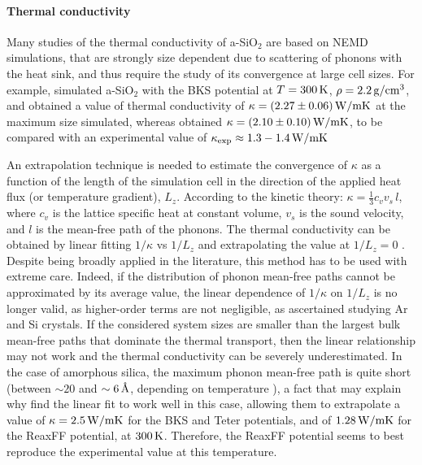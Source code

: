 \paragraph{Thermal conductivity}
Many studies of the thermal conductivity of a-SiO$_2$ are based on NEMD simulations, that are strongly size dependent due to scattering of phonons with the heat sink, and thus require the study of its convergence at large cell sizes. 
For example, \citet{Tian2017} simulated a-SiO$_2$ with the BKS potential at $T=300\,\mathrm{K}$, $\rho=2.2\,\mathrm{g/cm^3}$, and obtained a value of thermal conductivity of $\kappa=(2.27 \pm 0.06)\,\mathrm{W/mK}$ at the maximum size simulated, whereas \citet{Coquil2011} obtained $\kappa= (2.10 \pm 0.10)\,\mathrm{W/mK}$, to be compared with an experimental value of $\kappa_\mathrm{exp}\approx 1.3 - 1.4 \,\mathrm{W/mK}$

An extrapolation technique is needed to estimate the convergence of $\kappa$ as a function of the length of the simulation cell in the direction of the applied heat flux (or temperature gradient), $L_z$. According to the kinetic theory: $\kappa = \frac{1}{3} c_v v_s \,l$, where $c_v$ is the lattice specific heat at constant volume, $v_s$ is the sound velocity, and $l$ is the mean-free path of the phonons. The thermal conductivity can be obtained by linear fitting $1/\kappa$ vs $1/L_z$ and extrapolating the value at $1/L_z=0$ \cite{Schelling2002}. 
Despite being broadly applied in the literature, this method has to be used with extreme care. Indeed, if the distribution of phonon mean-free paths cannot be approximated by its average value, the linear dependence of $1/\kappa$ on $1/L_z$ is no longer valid, as higher-order terms are not negligible, as \citet{Sellan2010} ascertained studying Ar and Si crystals. If the considered system sizes are smaller than the largest bulk mean-free paths that dominate the thermal transport, then the linear relationship may not work and the thermal conductivity can be severely underestimated. 
In the case of amorphous silica, the maximum phonon mean-free path is quite short (between $\sim 20$ and $\sim 6\,\mathrm{{\mbox{\AA}}}$, depending on temperature \cite{Yu2006}), a fact that may explain why \citet{Tian2017} find the linear fit to work well in this case, allowing them to extrapolate a value of $\kappa=2.5\,\mathrm{W/mK}$ for the BKS and Teter potentials, and of $1.28\,\mathrm{W/mK}$ for the ReaxFF potential, at $300\,\mathrm{K}$. Therefore, the ReaxFF potential seems to best reproduce the experimental value at this temperature. 

